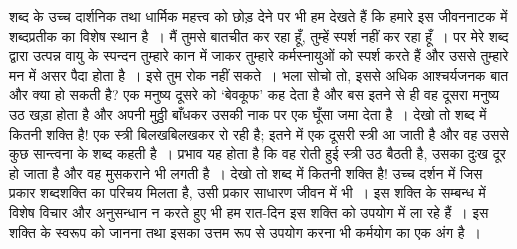 शब्द के उच्च दार्शनिक तथा धार्मिक महत्त्व को छोड़ देने पर भी हम देखते हैं कि हमारे इस जीवननाटक में शब्दप्रतीक का विशेष स्थान है~। मैं तुमसे बातचीत कर रहा हूँ, तुम्हें स्पर्श नहीं कर रहा हूँ~। पर मेरे शब्द द्वारा उत्पन्न वायु के स्पन्दन तुम्हारे कान में जाकर तुम्हारे कर्मस्नायुओं को स्पर्श करते हैं और उससे तुम्हारे मन में असर पैदा होता है~। इसे तुम रोक नहीं सकते~। भला सोचो तो, इससे अधिक आश्चर्यजनक बात और क्या हो सकती है? एक मनुष्य दूसरे को ‘बेवकूफ’ कह देता है और बस इतने से ही वह दूसरा मनुष्य उठ खड़ा होता है और अपनी मुठ्ठी बाँधकर उसकी नाक पर एक घूँसा जमा देता है~। देखो तो शब्द में कितनी शक्ति है! एक स्त्री बिलखबिलखकर रो रही है; इतने में एक दूसरी स्त्री आ जाती है और वह उससे कुछ सान्त्वना के शब्द कहती है~। प्रभाव यह होता है कि वह रोती हुई स्त्री उठ बैठती है, उसका दुःख दूर हो जाता है और वह मुसकराने भी लगती है~। देखो तो शब्द में कितनी शक्ति है! उच्च दर्शन में जिस प्रकार शब्दशक्ति का परिचय मिलता है, उसी प्रकार साधारण जीवन में भी~। इस शक्ति के सम्बन्ध में विशेष विचार और अनुसन्धान न करते हुए भी हम रात-दिन इस शक्ति को उपयोग में ला रहे हैं~। इस शक्ति के स्वरूप को जानना तथा इसका उत्तम रूप से उपयोग करना भी कर्मयोग का एक अंग है~।

